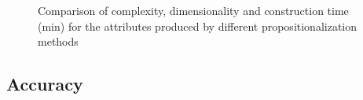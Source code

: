 		
						\begin{figure}
							\centering     %
							\caption{Comparison of complexity, dimensionality and construction time (min) for the attributes produced by different propositionalization methods}\label{fig:dimensionality}
						\end{figure}
		\subsection{Accuracy} 
		
